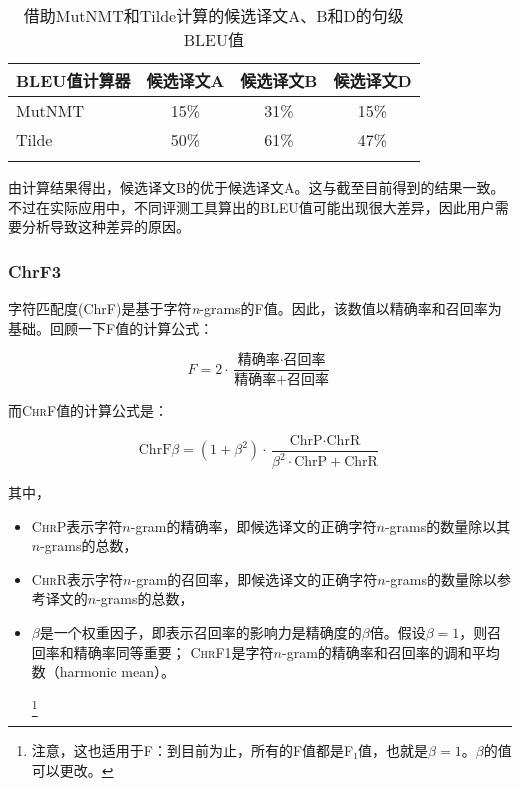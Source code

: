 \documentclass[output=paper]{langscibook}
\begin{document}
\begin{table}
\begin{tabular}{lccc}
\lsptoprule
{BLEU值计算器} & {候选译文A} & {候选译文B} & {候选译文D}\\
\midrule
MutNMT & 15\% & 31\% & 15\%\\
Tilde & 50\% & 61\% & 47\%\\
\lspbottomrule
\end{tabular}
\caption{借助MutNMT和Tilde计算的候选译文A、B和D的句级BLEU值\label{tab:rossi:13}}
\end{table}

由计算结果得出，候选译文B的优于候选译文A。这与截至目前得到的结果一致。不过在实际应用中，不同评测工具算出的BLEU值可能出现很大差异，因此用户需要分析导致这种差异的原因。


\subsubsection{\label{bkm:Ref57827977}ChrF3}
字符匹配度(ChrF)是基于字符\textit{n}-grams的F值。因此，该数值以精确率和召回率为基础。回顾一下F值的计算公式：

\begin{equation}
F=2 \cdot \frac{\text{精确率} \cdot \text{召回率}}{\text{精确率}+\text{召回率}}
\end{equation}

而\textsc{ChrF}值的计算公式是：

\begin{equation}
\text{ChrF}\beta =\left(1+\beta^2\right) \cdot \frac{\text{ChrP} \cdot \text{ChrR}}{\beta^2 \cdot \text{ChrP}+\text{ChrR}}
\end{equation}

其中，
\begin{itemize}
\item \textsc{ChrP}表示字符$n$-gram的精确率，即候选译文的正确字符$n$-grams的数量除以其$n$-grams的总数，

\item \textsc{ChrR}表示字符$n$-gram的召回率，即候选译文的正确字符$n$-grams的数量除以参考译文的$n$-grams的总数，

\item $\beta$是一个权重因子，即表示召回率的影响力是精确度的$\beta$倍。假设$\beta = 1$，则召回率和精确率同等重要； \textsc{ChrF1}是字符$n$-gram的精确率和召回率的调和平均数（harmonic
mean）\citep{Popović2015}。

\footnote{注意，这也适用于F：到目前为止，所有的F值都是F₁值，也就是$\beta=1$。$\beta$的值可以更改。}
\end{itemize}
\end{document}
